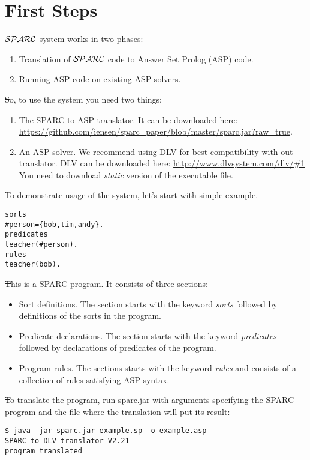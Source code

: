 \documentclass[12pt, letterpaper]{article}
\begin{document}
\section{First Steps}
${\cal SPARC}$ system  works in two phases:
\begin{enumerate}
\item Translation of ${\cal SPARC}$ code to Answer Set Prolog (ASP) code.
\item Running ASP code on existing ASP solvers.
\end{enumerate}

\st So, to use the system you need two things:
\begin{enumerate}
\item The SPARC to ASP translator. It can be downloaded here: \url{https://github.com/iensen/sparc_paper/blob/master/sparc.jar?raw=true}.
\item An ASP solver. We recommend using DLV for best compatibility with out translator. DLV can be downloaded here:
 \url{http://www.dlvsystem.com/dlv/#1}
You need to download \textit{static} version of the executable file.

\end{enumerate}
To demonstrate usage of the system, let's start with simple example.
\begin{verbatim}
sorts
#person={bob,tim,andy}.
predicates
teacher(#person).
rules
teacher(bob).
\end{verbatim}

\st This is a SPARC program. It consists of three sections:
\begin{itemize}
 \item Sort definitions. The section starts with the keyword \textit{sorts} followed by definitions of the sorts in the program.
 \item Predicate declarations. The section starts with the keyword \textit{predicates} followed by declarations of predicates of the program.
 \item Program rules. The sections starts with the keyword \textit{rules}  and consists of a collection of rules satisfying ASP syntax.
\end{itemize}

\st To translate the program, run sparc.jar with arguments specifying the SPARC program and the file where the translation will put its result:
\begin{verbatim}
$ java -jar sparc.jar example.sp -o example.asp
SPARC to DLV translator V2.21
program translated
\end{verbatim}
\end{document}
